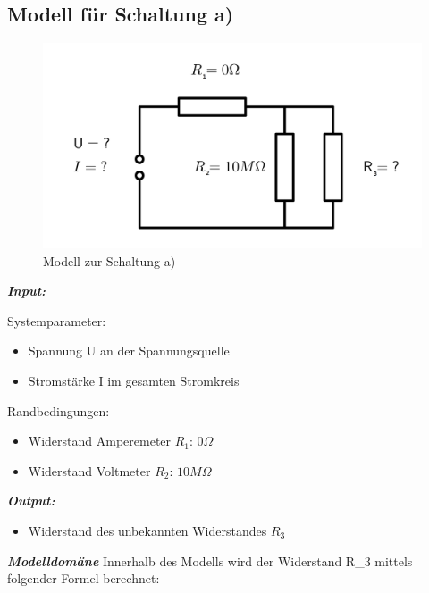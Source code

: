 \documentclass[class=article, crop=false]{standalone}
\providecommand{\tightlist}{%
  \setlength{\itemsep}{0pt}\setlength{\parskip}{0pt}}
\begin{document}
\hypertarget{modell-fuxfcr-schaltung-a}{%
\subsection{Modell für Schaltung a)}\label{modell-fuxfcr-schaltung-a}}

\begin{figure}
\centering
\includegraphics[width=\textwidth,height=0.2\textheight]{Bilder/ModellA.png}
\caption{Modell zur Schaltung a)}
\end{figure}

\textbf{\emph{Input:}}

Systemparameter:

\begin{itemize}
\tightlist
\item
  Spannung U an der Spannungsquelle
\item
  Stromstärke I im gesamten Stromkreis
\end{itemize}

Randbedingungen:

\begin{itemize}
\tightlist
\item
  Widerstand Amperemeter \(R_1\): \(0\Omega\)
\item
  Widerstand Voltmeter \(R_2\): \(10M\Omega\)
\end{itemize}

\textbf{\emph{Output:}}

\begin{itemize}
\tightlist
\item
  Widerstand des unbekannten Widerstandes \(R_3\)
\end{itemize}

\textbf{\emph{Modelldomäne}} Innerhalb des Modells wird der Widerstand
R\_3 mittels folgender Formel berechnet:
\end{document}
